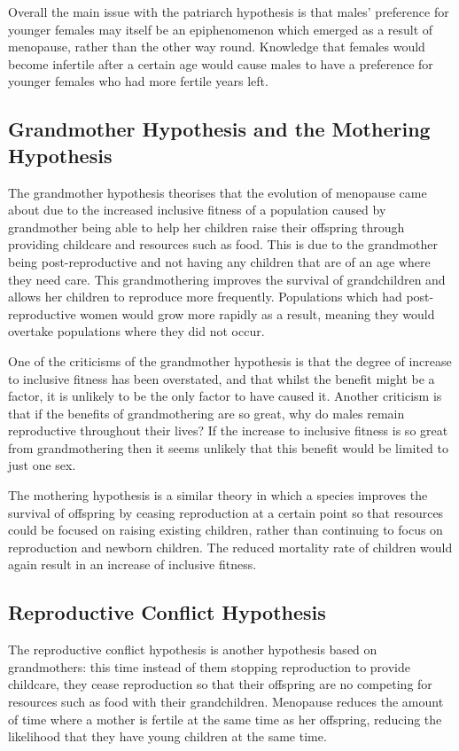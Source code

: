 \documentclass[authoryearcitations]{UoYCSproject}
\begin{document}
Overall the main issue with the patriarch hypothesis is that males' preference for younger females may itself be an epiphenomenon which emerged as a result of menopause, rather than the other way round. Knowledge that females would become infertile after a certain age would cause males to have a preference for younger females who had more fertile years left.

\subsection{Grandmother Hypothesis and the Mothering Hypothesis}
The grandmother hypothesis \cite{grandmother2000, grandmotheringProbabilistic2014, longevityGrandmother2012} theorises that the evolution of menopause came about due to the increased inclusive fitness of a population caused by grandmother being able to help her children raise their offspring through providing childcare and resources such as food. This is due to the grandmother being post-reproductive and not having any children that are of an age where they need care. This grandmothering improves the survival of grandchildren and allows her children to reproduce more frequently. Populations which had post-reproductive women would grow more rapidly as a result, meaning they would overtake populations where they did not occur. 

One of the criticisms of the grandmother hypothesis is that the degree of increase to inclusive fitness has been overstated, and that whilst the benefit might be a factor, it is unlikely to be the only factor to have caused it. Another criticism is that if the benefits of grandmothering are so great, why do males remain reproductive throughout their lives? If the increase to inclusive fitness is so great from grandmothering then it seems unlikely that this benefit would be limited to just one sex.

The mothering hypothesis is a similar theory in which a species improves the survival of offspring by ceasing reproduction at a certain point so that resources could be focused on raising existing children, rather than continuing to focus on reproduction and newborn children. The reduced mortality rate of children would again result in an increase of inclusive fitness.

\subsection{Reproductive Conflict Hypothesis}
The reproductive conflict hypothesis \cite{cant2008reproductive, repConflictOrca2017} is another hypothesis based on grandmothers: this time instead of them stopping reproduction to provide childcare, they cease reproduction so that their offspring are no competing for resources such as food with their grandchildren. Menopause reduces the amount of time where a mother is fertile at the same time as her offspring, reducing the likelihood that they have young children at the same time.
\end{document}
